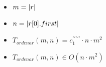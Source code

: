 \documentclass{article}
\begin{document}
    \begin{itemize}
        \item $m = |r|$
        \item $n = |r[0].first|$
        \item $T_{ordenar}(m, n) = c^{\prime\prime\prime\prime\prime}_1 \cdot n \cdot m^2$
        \item $T_{ordenar}(m, n) \in O(n \cdot m^{2})$
    \end{itemize}
\end{document}
